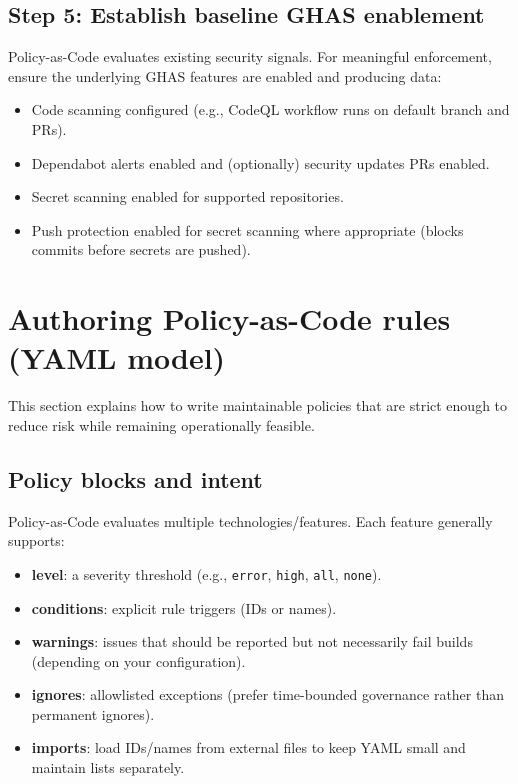 \documentclass[11pt]{article}
\renewcommand{\cmd}[1]{\texttt{#1}}
\begin{document}
\subsection{Step 5: Establish baseline GHAS enablement}

Policy-as-Code evaluates existing security signals. For meaningful enforcement, ensure the underlying GHAS features are enabled and producing data:
\begin{itemize}[leftmargin=*]
  \item Code scanning configured (e.g., CodeQL workflow runs on default branch and PRs).
  \item Dependabot alerts enabled and (optionally) security updates PRs enabled.
  \item Secret scanning enabled for supported repositories.
  \item Push protection enabled for secret scanning where appropriate (blocks commits before secrets are pushed).
\end{itemize}

\section{Authoring Policy-as-Code rules (YAML model)}

This section explains how to write maintainable policies that are strict enough to reduce risk while remaining operationally feasible.

\subsection{Policy blocks and intent}

Policy-as-Code evaluates multiple technologies/features. Each feature generally supports:
\begin{itemize}[leftmargin=*]
  \item \textbf{level}: a severity threshold (e.g., \cmd{error}, \cmd{high}, \cmd{all}, \cmd{none}).
  \item \textbf{conditions}: explicit rule triggers (IDs or names).
  \item \textbf{warnings}: issues that should be reported but not necessarily fail builds (depending on your configuration).
  \item \textbf{ignores}: allowlisted exceptions (prefer time-bounded governance rather than permanent ignores).
  \item \textbf{imports}: load IDs/names from external files to keep YAML small and maintain lists separately.
\end{itemize}
\end{document}
